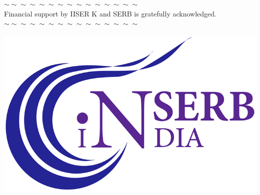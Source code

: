 \documentclass[10pt,aspectratio=169]{beamer}
\begin{document}
\begin{frame}{}
\begin{minipage}{0.12\textwidth}
\end{minipage}
\hspace*{\fill}
\begin{minipage}{0.69\textwidth}
\centering
\alert{$\sim\sim\sim\sim\sim\sim\sim\sim\sim\sim\sim\sim\sim\sim\sim$ }\\
\alert{Financial support by IISER K and SERB is gratefully acknowledged.}\\
\alert{$\sim\sim\sim\sim\sim\sim\sim\sim\sim\sim\sim\sim\sim\sim\sim$ }\\
\end{minipage}
\hspace*{\fill}
\begin{minipage}{0.12\textwidth}
\includegraphics[width=\textwidth]{SERB.png}
\end{minipage}
\vspace*{\fill}


\end{frame}
\end{document}
